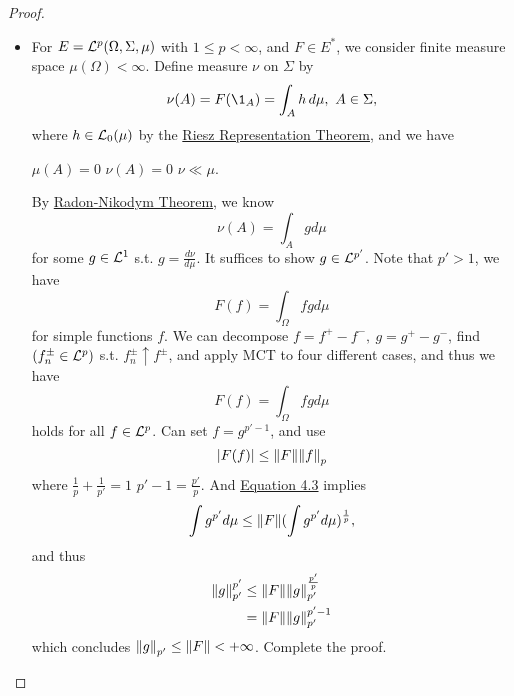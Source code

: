 \begin{proof}
\begin{itemize}
\begin{proof}[Summary]
    If $1 < p \leq \infty$, then $\sup_{\norm{f}_p = 1} \abs{F(f)}$ is attained.\\ 
    For $p = 1$, the supremum is not attained.
    \end{proof}
    \item For $E = \mathcal{L}^p(\Omega,\Sigma,\mu)$ with $1 \leq p < \infty$, and $F \in E^*$, we consider finite measure space $\mu(\Omega) < \infty$. Define measure $\nu$ on $\Sigma$ by
    \begin{equation*}
        \nu(A) = F(\1_A) = \int_A h \dr \mu,\ A \in \Sigma,
    \end{equation*}
    where $h \in \mathcal{L}_0(\mu)$ by the \hyperref[RRT]{Riesz Representation Theorem}, and we have
    \begin{center}
        $\mu(A) = 0$ \imply $\nu(A) = 0$ \imply $\nu \ll \mu$.
    \end{center}
    By \hyperref[R-N thm]{Radon-Nikodym Theorem}, we know
    \begin{equation*}
        \nu(A) = \int_A g d\mu
    \end{equation*}
    for some $g \in \mathcal{L}^1$ s.t. $g = \frac{d\nu}{d\mu}$. It suffices to show $g \in \mathcal{L}^{p'}$. Note that $p' > 1$, we have
    \begin{equation*}
        F(f) = \int_{\Omega} fg d\mu
    \end{equation*}
    for simple functions $f$. We can decompose $f = f^+ - f^-,\ g = g^+ - g^-$, find $(f_n^{\pm} \in \mathcal{L}^p)$ s.t. $f_n^{\pm} \uparrow f^{\pm}$, and apply MCT to four different cases, and thus we have
    \begin{equation*}
            F(f) = \int_{\Omega} fg d\mu
    \end{equation*}
    holds for all $f \in \mathcal{L}^p$. Can set $f = g^{p' - 1}$, and use 
    \begin{equation}
        \abs{F(f)} \leq \norm{F} \norm{f}_p\label{eq:4.3}
    \end{equation}
    where $\frac{1}{p} + \frac{1}{p'} = 1$ \imply $p' - 1 = \frac{p'}{p}$. And \hyperref[eq:4.3]{Equation 4.3} implies
    \begin{equation*}
        \int g^{p'} d\mu \leq \norm{F} (\int g^{p'} d\mu)^{\frac{1}{p}},
    \end{equation*}
    and thus
    \begin{align*}
        \norm{g}_{p'}^{p'} &\leq \norm{F} \norm{g}_{p'}^{\frac{p'}{p}}\\
        &= \norm{F} \norm{g}_{p'}^{p' - 1}
    \end{align*}
    which concludes $\norm{g}_{p'} \leq \norm{F} < +\infty$. Complete the proof.
\end{itemize}
\end{proof}

